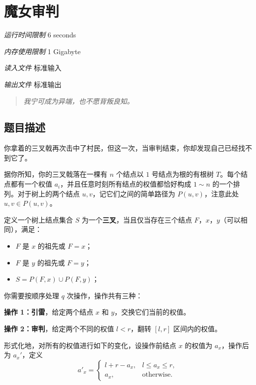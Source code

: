 \section[M. 魔女审判]{ 魔女审判}

\textit{运行时间限制}   6 seconds

\textit{内存使用限制} 1 Gigabyte

\textit{读入文件} \qquad 标准输入

\textit{输出文件} \qquad 标准输出


\begin{quote}
	\textit{我宁可成为异端，也不愿背叛良知。}
\end{quote}

\subsection{题目描述}

你拿着的三叉戟再次击中了村民，但这一次，当审判结束，你却发现自己已经找不到它了。

据你所知，你的三叉戟落在一棵有 $n$ 个结点以 $1$ 号结点为根的有根树 $T$。每个结点都有一个权值 $a_i$，并且任意时刻所有结点的权值都恰好构成 $1 \sim n$ 的一个排列。对于树上的两个结点 $u,v$，记它们之间的简单路径为 $P(u,v)$，注意此处 $u , v \in P(u, v)$。

定义一个树上结点集合 $S$ 为一个\textbf{三叉}，当且仅当存在三个结点 $F$，$x$，$y$（可以相同），满足：

\begin{itemize}
	\item $F$ 是 $x$ 的祖先或 $F=x$；
	\item $F$ 是 $y$ 的祖先或 $F=y$；
	\item $S = P(F,x)\cup P(F,y)$；
\end{itemize}


你需要按顺序处理 $q$ 次操作，操作共有三种：

\textbf{操作 1：引雷}，给定两个结点 $x$ 和 $y$，交换它们当前的权值。

\textbf{操作 2：审判}，给定两个不同的权值 $l < r$，翻转 $[l, r]$ 区间内的权值。

形式化地，对所有的权值进行如下的变化，设操作前结点 $x$ 的权值为 $a_x$，操作后为 $a_x'$，定义
\[
a'_x=
\begin{cases}
l+r-a_x, & l\le a_x\le r,\\
a_x, & \text{otherwise}.
\end{cases}
\]

